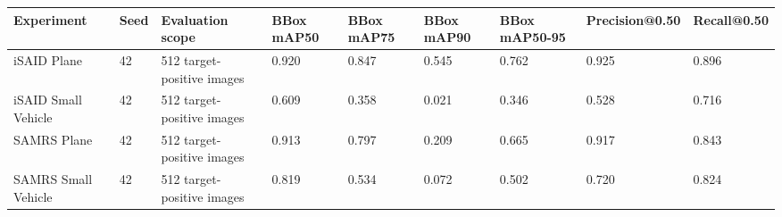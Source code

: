\begin{tabular}{lllllllll}
\toprule
Experiment & Seed & Evaluation scope & BBox mAP50 & BBox mAP75 & BBox mAP90 & BBox mAP50-95 & Precision@0.50 & Recall@0.50 \\
\midrule
iSAID Plane & 42 & 512 target-positive images & 0.920 & 0.847 & 0.545 & 0.762 & 0.925 & 0.896 \\
iSAID Small Vehicle & 42 & 512 target-positive images & 0.609 & 0.358 & 0.021 & 0.346 & 0.528 & 0.716 \\
SAMRS Plane & 42 & 512 target-positive images & 0.913 & 0.797 & 0.209 & 0.665 & 0.917 & 0.843 \\
SAMRS Small Vehicle & 42 & 512 target-positive images & 0.819 & 0.534 & 0.072 & 0.502 & 0.720 & 0.824 \\
\bottomrule
\end{tabular}
